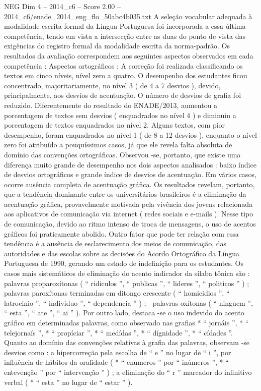 \begin{textsample}{NEG Dim 4 – 2014\_c6 – Score 2.00 – 2014\_c6/enade\_2014\_eng\_flo\_50abc4b035.txt}
A seleção vocabular adequada à modalidade escrita formal da Língua Portuguesa foi incorporada a essa última competência, tendo em vista a intersecção entre as duas do ponto de vista das exigências do registro formal da modalidade escrita da norma-padrão.
Os resultados da avaliação correspondem aos seguintes aspectos observados em cada competência : Aspectos ortográficos : A correção foi realizada classificando os textos em cinco níveis, nível zero a quatro.
O desempenho dos estudantes ficou concentrado, majoritariamente, no nível 3 ( de 4 a 7 desvios ), devido, principalmente, aos desvios de acentuação.
O número de desvios de grafia foi reduzido.
Diferentemente do resultado do ENADE/2013, aumentou a porcentagem de textos sem desvios ( enquadrados no nível 4 ) e diminuiu a porcentagem de textos enquadrados no nível 2.
Alguns textos, com pior desempenho, foram enquadrados no nível 1 ( de 8 a 12 desvios ), enquanto o nível zero foi atribuído a pouquíssimos casos, já que ele revela falta absoluta de domínio das convenções ortográficas.
Observou -se, portanto, que existe uma diferença muito grande de desempenho nos dois aspectos analisados : baixo índice de desvios ortográficos e grande índice de desvios de acentuação.
Em vários casos, ocorre ausência completa de acentuação gráfica.
Os resultados revelam, portanto, que a tendência dominante entre os universitários brasileiros é a eliminação da acentuação gráfica, provavelmente motivada pela vivência dos jovens relacionada aos aplicativos de comunicação via internet ( redes sociais e e-mails ).
Nesse tipo de comunicação, devido ao ritmo intenso de troca de mensagens, o uso de acentos gráficos foi praticamente abolido.
Outro fator que pode ter relação com essa tendência é a ausência de esclarecimento dos meios de comunicação, das autoridades e das escolas sobre as decisões do Acordo Ortográfico da Língua Portuguesa de 1990, gerando um estado de indefinição para os estudantes.
Os casos mais sistemáticos de eliminação do acento indicador da sílaba tônica são :  palavras proparoxítonas ( “ ridiculos ”, “ publicas ”, “ lideres ”, “ politicos ” ) ;  palavras paroxítonas terminadas em ditongo crescente ( “ homicidios ”, “ latrocinio ”, “ individuo ”, “ dependencia ” ) ;  palavras oxítonas ( “ ninguem ”, “ esta ”, “ ate ”, “ ai ” ).
Por outro lado, destaca -se o uso indevido do acento gráfico em determinadas palavras, como observado nas grafias * “ jornáis ”, * “ telejornaís ”, * “ propíciar ”, * “ medídas ”, * “ dígnidade ”, * “ cídades ”.
Quanto ao domínio das convenções relativas à grafia das palavras, observam -se desvios como : a hipercorreção pela escolha de “ e ” no lugar de “ i ”, por influência de hábitos da oralidade ( * “ enumeros ” por “ inúmeros ”, * “ entevenção ” por “ intervenção ” ) ; a eliminação do “ r ” marcador do infinitivo verbal ( * “ esta ” no lugar de “ estar ” ).

\end{textsample}
